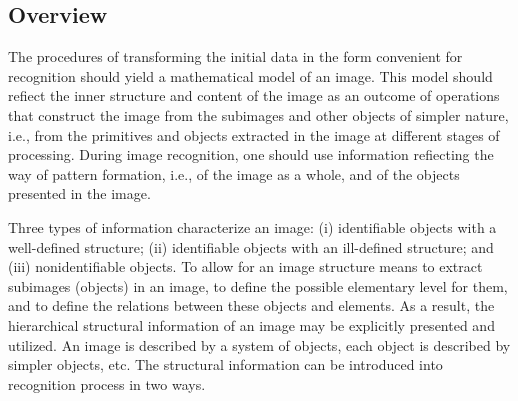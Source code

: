 \subsection{Overview}


The procedures of transforming the initial data in the form 
convenient for recognition should yield a mathematical model of an image. 
This model should refiect the inner structure and content of the image as an 
outcome of operations that construct the image from the subimages and other 
objects of simpler nature, i.e., from the primitives and objects extracted in the 
image at different stages of processing. During image recognition, one should use 
information refiecting the way of pattern formation, i.e., of the image as a whole, 
and of the objects presented in the image.  

Three types of information characterize an image: (i) identifiable objects with a 
well-defined structure; (ii) identifiable objects with an ill-defined structure; 
and (iii) nonidentifiable objects. To allow for an image structure means to extract 
subimages (objects) in an image, to define the possible elementary level for them, 
and to define the relations between these objects and elements. As a result, 
the hierarchical structural information of an image may be explicitly presented and 
utilized. An image is described by a system of objects, each object is described by 
simpler objects, etc. The structural information can be introduced into recognition 
process in two ways. 

